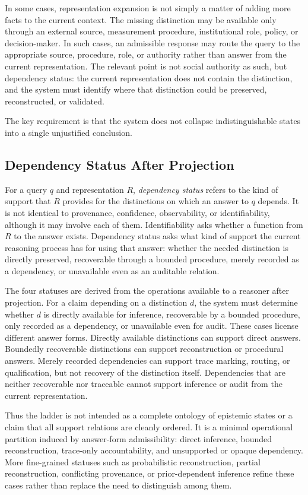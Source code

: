 \documentclass[11pt]{article}
\begin{document}
In some cases, representation expansion is not simply a matter of adding more facts to the current context. The missing distinction may be available only through an external source, measurement procedure, institutional role, policy, or decision-maker. In such cases, an admissible response may route the query to the appropriate source, procedure, role, or authority rather than answer from the current representation. The relevant point is not social authority as such, but dependency status: the current representation does not contain the distinction, and the system must identify where that distinction could be preserved, reconstructed, or validated.

The key requirement is that the system does not collapse indistinguishable states into a single unjustified conclusion.

\subsection{Dependency Status After Projection}

For a query $q$ and representation $R$, \emph{dependency status} refers to the kind of support that $R$ provides for the distinctions on which an answer to $q$ depends. It is not identical to provenance, confidence, observability, or identifiability, although it may involve each of them. Identifiability asks whether a function from $R$ to the answer exists. Dependency status asks what kind of support the current reasoning process has for using that answer: whether the needed distinction is directly preserved, recoverable through a bounded procedure, merely recorded as a dependency, or unavailable even as an auditable relation.

The four statuses are derived from the operations available to a reasoner after projection. For a claim depending on a distinction $d$, the system must determine whether $d$ is directly available for inference, recoverable by a bounded procedure, only recorded as a dependency, or unavailable even for audit. These cases license different answer forms. Directly available distinctions can support direct answers. Boundedly recoverable distinctions can support reconstruction or procedural answers. Merely recorded dependencies can support trace marking, routing, or qualification, but not recovery of the distinction itself. Dependencies that are neither recoverable nor traceable cannot support inference or audit from the current representation.

Thus the ladder is not intended as a complete ontology of epistemic states or a claim that all support relations are cleanly ordered. It is a minimal operational partition induced by answer-form admissibility: direct inference, bounded reconstruction, trace-only accountability, and unsupported or opaque dependency. More fine-grained statuses such as probabilistic reconstruction, partial reconstruction, conflicting provenance, or prior-dependent inference refine these cases rather than replace the need to distinguish among them.
\end{document}

